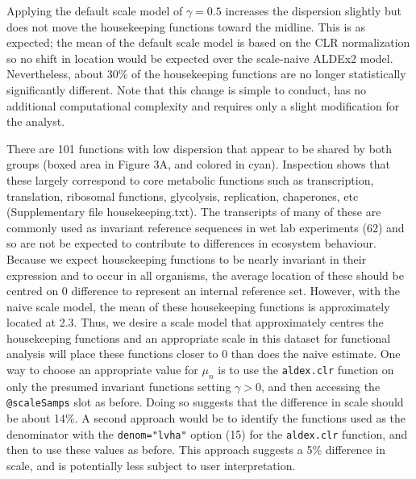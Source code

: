 \documentclass[
]{article}
\begin{document}
Applying the default scale model of \(\gamma=0.5\) increases the
dispersion slightly but does not move the housekeeping functions toward
the midline. This is as expected; the mean of the default scale model is
based on the CLR normalization so no shift in location would be expected
over the scale-naive ALDEx2 model. Nevertheless, about 30\% of the
housekeeping functions are no longer statistically significantly
different. Note that this change is simple to conduct, has no additional
computational complexity and requires only a slight modification for the
analyst.

There are 101 functions with low dispersion that appear to be shared by
both groups (boxed area in Figure 3A, and colored in cyan). Inspection
shows that these largely correspond to core metabolic functions such as
transcription, translation, ribosomal functions, glycolysis,
replication, chaperones, etc (Supplementary file housekeeping.txt). The
transcripts of many of these are commonly used as invariant reference
sequences in wet lab experiments (62) and so are not be expected to
contribute to differences in ecosystem behaviour. Because we expect
housekeeping functions to be nearly invariant in their expression and to
occur in all organisms, the average location of these should be centred
on 0 difference to represent an internal reference set. However, with
the naive scale model, the mean of these housekeeping functions is
approximately located at 2.3. Thus, we desire a scale model that
approximately centres the housekeeping functions and an appropriate
scale in this dataset for functional analysis will place these functions
closer to 0 than does the naive estimate. One way to choose an
appropriate value for \(\mu_n\) is to use the \texttt{aldex.clr}
function on only the presumed invariant functions setting
\(\gamma > 0\), and then accessing the \texttt{@scaleSamps} slot as
before. Doing so suggests that the difference in scale should be about
14\%. A second approach would be to identify the functions used as the
denominator with the \texttt{denom="lvha"} option (15) for the
\texttt{aldex.clr} function, and then to use these values as before.
This approach suggests a 5\% difference in scale, and is potentially
less subject to user interpretation.
\end{document}
